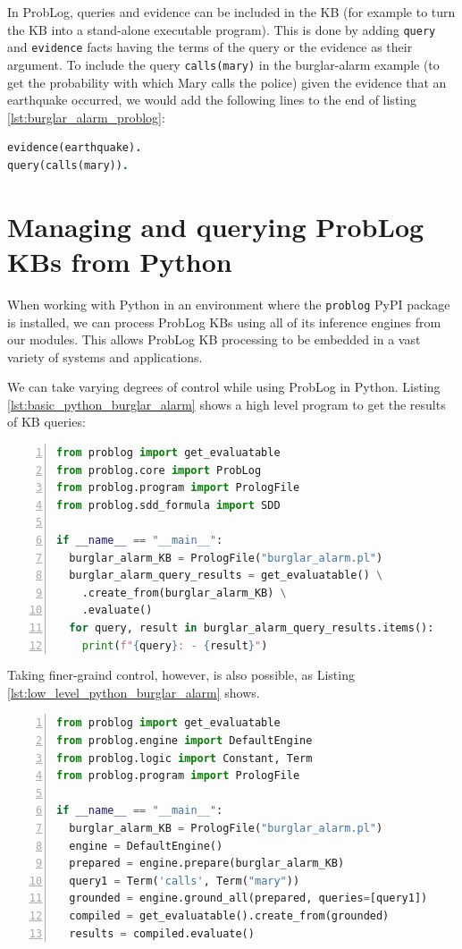 In ProbLog, queries and evidence can be included in the KB (for example to turn the KB into a stand-alone executable program). This is done by adding \texttt{query} and \texttt{evidence} facts having the terms of the query or the evidence as their argument. To include the query \texttt{calls(mary)} in the burglar-alarm example (to get the probability with which Mary calls the police) given the evidence that an earthquake occurred, we would add the following lines to the end of listing \ref{lst:burglar_alarm_problog}:
\begin{lstlisting}[language=Prolog]
evidence(earthquake).
query(calls(mary)).
\end{lstlisting}

\section{Managing and querying ProbLog KBs from Python}
When working with Python in an environment where the \texttt{problog} PyPI package is installed, we can process ProbLog KBs using all of its inference engines from our modules. This allows ProbLog KB processing to be embedded in a vast variety of systems and applications.

We can take varying degrees of control while using ProbLog in Python. Listing \ref{lst:basic_python_burglar_alarm} shows a high level program to get the results of KB queries:
\begin{lstlisting}[language=Python, caption={basic\_burglar\_alarm.py, high level burglar-alarm model querying in Python}, numbers=left, label={lst:basic_python_burglar_alarm}, captionpos=b]
from problog import get_evaluatable
from problog.core import ProbLog
from problog.program import PrologFile
from problog.sdd_formula import SDD

if __name__ == "__main__":
  burglar_alarm_KB = PrologFile("burglar_alarm.pl")
  burglar_alarm_query_results = get_evaluatable() \
    .create_from(burglar_alarm_KB) \
    .evaluate()
  for query, result in burglar_alarm_query_results.items():
    print(f"{query}: - {result}")    
\end{lstlisting}
Taking finer-graind control, however, is also possible, as Listing \ref{lst:low_level_python_burglar_alarm} shows.
\begin{lstlisting}[language=Python, caption={low\_level\_burglar\_alarm.py, low level burglar-alarm model querying in Python}, numbers=left, label={lst:low_level_python_burglar_alarm}, captionpos=b]
from problog import get_evaluatable
from problog.engine import DefaultEngine
from problog.logic import Constant, Term
from problog.program import PrologFile

if __name__ == "__main__":
  burglar_alarm_KB = PrologFile("burglar_alarm.pl")
  engine = DefaultEngine()
  prepared = engine.prepare(burglar_alarm_KB)
  query1 = Term('calls', Term("mary"))
  grounded = engine.ground_all(prepared, queries=[query1])
  compiled = get_evaluatable().create_from(grounded)
  results = compiled.evaluate()
\end{lstlisting}

